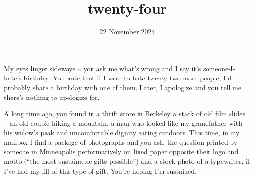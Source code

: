\documentclass[11pt]{article}
\title{twenty-four}
\date{22 November 2024}
\begin{document}
    \maketitle
    My eyes linger sideways -- you ask me what's wrong and I say it's someone-I-hate's birthday. You note that if I were to hate twenty-two more people, I'd probably share a birthday with one of them. Later, I apologize and you tell me there's nothing to apologize for. 

    A long time ago, you found in a thrift store in Berkeley a stack of old film slides -- an old couple hiking a mountain, a man who looked like my grandfather with his widow's peak and uncomfortable dignity eating outdoors. This time, in my mailbox I find a package of photographs and you ask, the question printed by someone in Minneapolis performatively on lined paper opposite their logo and motto (``the most sustainable gifts possible'') and a stock photo of a typewriter, if I've had my fill of this type of gift. You're hoping I'm sustained.
    
    \newpage
    \printbibliography[title={Bibliography}]
\end{document}
